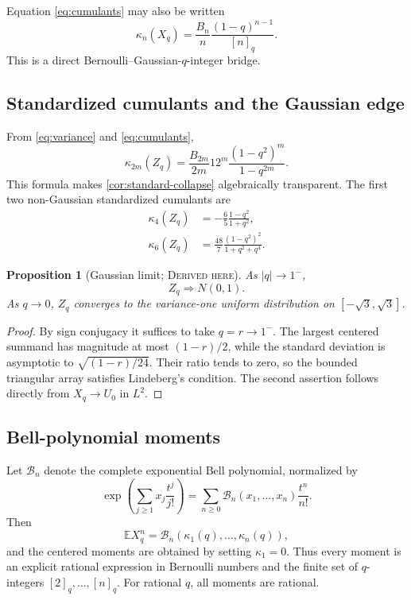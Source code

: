 \documentclass[11pt,oneside]{article}
\newtheorem{proposition}[theorem]{Proposition}
\theoremstyle{definition}
\theoremstyle{remark}
\newcommand{\E}{\mathbb E}
\newcommand{\Bell}{\mathcal B}
\newcommand{\Derived}{\textsc{Derived here}}
\begin{document}
Equation \eqref{eq:cumulants} may also be written
\[
 \kappa_n(X_q)=\frac{B_n}{n}\frac{(1-q)^{n-1}}{[n]_q}.
\]
This is a direct Bernoulli--Gaussian-\(q\)-integer bridge.

\subsection{Standardized cumulants and the Gaussian edge}
From \eqref{eq:variance} and \eqref{eq:cumulants},
\begin{equation}\label{eq:standard-cumulants}
 \kappa_{2m}(Z_q)=
 \frac{B_{2m}}{2m}12^m\frac{(1-q^2)^m}{1-q^{2m}}.
\end{equation}
This formula makes \cref{cor:standard-collapse} algebraically transparent.
The first two non-Gaussian standardized cumulants are
\begin{align}
 \kappa_4(Z_q)&=-\frac65\frac{1-q^2}{1+q^2},\label{eq:kurtosis}\\
 \kappa_6(Z_q)&=\frac{48}{7}
 \frac{(1-q^2)^2}{1+q^2+q^4}.
 \label{eq:sixth}
\end{align}

\begin{proposition}[Gaussian limit; \Derived]
As \(|q|\to1^-\),
\begin{equation}\label{eq:gaussian-limit}
 Z_q\Longrightarrow N(0,1).
\end{equation}
As \(q\to0\), \(Z_q\) converges to the variance-one uniform distribution on
\([-\sqrt3,\sqrt3]\).
\end{proposition}

\begin{proof}
By sign conjugacy it suffices to take \(q=r\to1^-\).  The largest centered
summand has magnitude at most \((1-r)/2\), while the standard deviation is
asymptotic to \(\sqrt{(1-r)/24}\).  Their ratio tends to zero, so the bounded
triangular array satisfies Lindeberg's condition.  The second assertion follows
directly from \(X_q\to U_0\) in \(L^2\).
\end{proof}

\subsection{Bell-polynomial moments}
Let \(\Bell_n\) denote the complete exponential Bell polynomial, normalized by
\[
 \exp\left(\sum_{j\ge1}x_j\frac{t^j}{j!}\right)
 =\sum_{n\ge0}\Bell_n(x_1,\ldots,x_n)\frac{t^n}{n!}.
\]
Then
\begin{equation}\label{eq:bell-raw}
 \E X_q^n=\Bell_n(\kappa_1(q),\ldots,\kappa_n(q)),
\end{equation}
and the centered moments are obtained by setting \(\kappa_1=0\).  Thus every
moment is an explicit rational expression in Bernoulli numbers and the finite
set of \(q\)-integers \([2]_q,\ldots,[n]_q\).  For rational \(q\), all moments
are rational.
\end{document}
